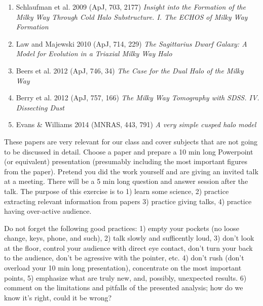 \documentclass[12pt]{article}
\begin{document}
\begin{enumerate}
  {\it Light Curve Templates and Galactic Distribution of RR Lyrae Stars from Sloan Digital Sky Survey Stripe 82}
\item Schlaufman et al. 2009 (ApJ, 703, 2177)
  {\it Insight into the Formation of the Milky Way Through Cold Halo Substructure. I. The ECHOS of Milky Way Formation}
\item Law and Majewski 2010 (ApJ, 714, 229) 
 {\it The Sagittarius Dwarf Galaxy: A Model for Evolution in a Triaxial Milky Way Halo}
\item Beers et al. 2012 (ApJ, 746, 34) 
 {\it The Case for the Dual Halo of the Milky Way}
\item Berry et al. 2012 (ApJ, 757, 166)
 {\it The Milky Way Tomography with SDSS. IV. Dissecting Dust}
\item Evans \& Williams 2014 (MNRAS, 443, 791)
 {\it A very simple cusped halo model} 
\end{enumerate}


These papers are very relevant for our class and cover subjects that are
not going to be discussed in detail. Choose a paper and prepare a 10 min long 
Powerpoint (or equivalent) presentation
(presumably including the most important figures from the paper). Pretend 
you did the work yourself and are giving an invited talk at a meeting. 
There will be a 5 min long question and answer session after the talk. 
The purpose of this exercise is to 1) learn some science, 2) practice 
extracting relevant information from papers 3) practice giving talks,
4) practice having over-active audience.

Do not forget the following good practices: 1) empty your pockets (no loose 
change, keys, phone, and such),
2) talk slowly and sufficently loud, 3) don't look at the floor, control
your audience with direct eye contact, don't turn your back to the audience, 
don't be agressive with the pointer, etc. 4) don't rush (don't overload 
your 10 min long presentation), concentrate on the most important points,
5) emphasize what are truly new, and, possibly, unexpected results.
6) comment on the limitations and pitfalls of the presented analysis;
how do we know it's right, could it be wrong?
\end{document}
